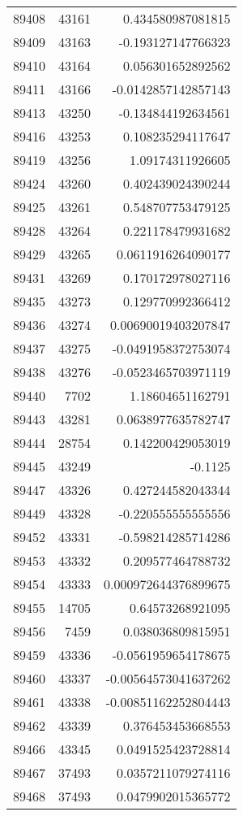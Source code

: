 \begin{tabular}{r | r | r}
89408 & 43161 & 0.434580987081815 \\
89409 & 43163 & -0.193127147766323 \\
89410 & 43164 & 0.056301652892562 \\
89411 & 43166 & -0.0142857142857143 \\
89413 & 43250 & -0.134844192634561 \\
89416 & 43253 & 0.108235294117647 \\
89419 & 43256 & 1.09174311926605 \\
89424 & 43260 & 0.402439024390244 \\
89425 & 43261 & 0.548707753479125 \\
89428 & 43264 & 0.221178479931682 \\
89429 & 43265 & 0.0611916264090177 \\
89431 & 43269 & 0.170172978027116 \\
89435 & 43273 & 0.129770992366412 \\
89436 & 43274 & 0.00690019403207847 \\
89437 & 43275 & -0.0491958372753074 \\
89438 & 43276 & -0.0523465703971119 \\
89440 & 7702 & 1.18604651162791 \\
89443 & 43281 & 0.0638977635782747 \\
89444 & 28754 & 0.142200429053019 \\
89445 & 43249 & -0.1125 \\
89447 & 43326 & 0.427244582043344 \\
89449 & 43328 & -0.220555555555556 \\
89452 & 43331 & -0.598214285714286 \\
89453 & 43332 & 0.209577464788732 \\
89454 & 43333 & 0.000972644376899675 \\
89455 & 14705 & 0.64573268921095 \\
89456 & 7459 & 0.038036809815951 \\
89459 & 43336 & -0.0561959654178675 \\
89460 & 43337 & -0.00564573041637262 \\
89461 & 43338 & -0.00851162252804443 \\
89462 & 43339 & 0.376453453668553 \\
89466 & 43345 & 0.0491525423728814 \\
89467 & 37493 & 0.0357211079274116 \\
89468 & 37493 & 0.0479902015365772 \\

\end{tabular}
